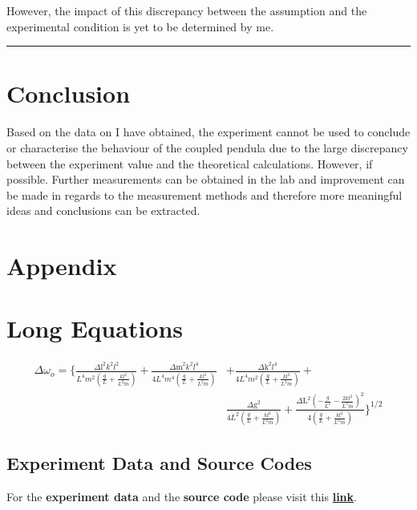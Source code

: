 \documentclass[aps,prl,reprint,10pt,amsmath,amssymb,superscriptaddress,a4paper]{revtex4-2}
\begin{document}
However, the impact of this discrepancy between the assumption and the experimental condition is yet to be determined by me.
\par\noindent\rule{\linewidth}{0.4pt}

\section{Conclusion}
Based on the data on I have obtained, the experiment cannot be used to conclude or characterise the behaviour of the coupled pendula due to the large discrepancy between the experiment value and the theoretical calculations. However, if possible. Further measurements can be obtained in the lab and improvement can be made in regards to the measurement methods and therefore more meaningful ideas and conclusions can be extracted.








\newpage


\onecolumngrid
\newpage
\appendix
\section{Appendix}
\section{Long Equations}\label{LE}
\begin{equation}
    \begin{split}
        \Delta \omega_o = \Biggl\{\frac{\text{$\Delta $l}^2 k^2 l^2}{L^4 m^2 \left(\frac{g}{L}+\frac{k l^2}{L^2 m}\right)}+\frac{\text{$\Delta $m}^2 k^2 l^4}{4 L^4 m^4 \left(\frac{g}{L}+\frac{k l^2}{L^2 m}\right)}&+\frac{\text{$\Delta $k}^2 l^4}{4 L^4 m^2 \left(\frac{g}{L}+\frac{k l^2}{L^2 m}\right)}+\\
        &\frac{\text{$\Delta $g}^2}{4 L^2 \left(\frac{g}{L}+\frac{k l^2}{L^2 m}\right)}+\frac{\text{$\Delta $L}^2 \left(-\frac{g}{L^2}-\frac{2 k l^2}{L^3 m}\right)^2}{4 \left(\frac{g}{L}+\frac{k l^2}{L^2 m}\right)}\Biggr\}^{1/2} \label{eq7}
    \end{split}
\end{equation}
\subsection{Experiment Data and Source Codes}
For the \textbf{experiment data} and the \textbf{source code} please visit this \href{https://github.com/jojounderscorejo/CheatSheetRepo/tree/main/Otherthings/PHYS2113%20CP%20LAB}{\textbf{link}}.
\end{document}
